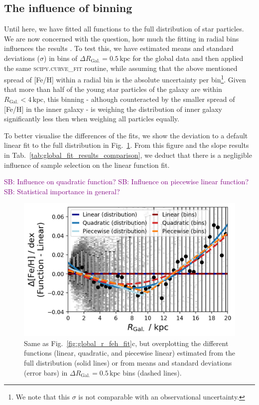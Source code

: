 \documentclass[fleqn,usenatbib]{mnras}
\newcommand{\SB}[1]{{\textcolor{purple}{SB: #1}}}
\begin{document}
\subsection{The influence of binning}

Until here, we have fitted all functions to the full distribution of star particles. We are now concerned with the question, how much the fitting in radial bins influences the results \citep[see also][who fitted functions to radially binned IllustrisTNG data]{Hemler2021}. To test this, we have estimated means and standard deviations ($\sigma$) in bins of $\Delta R_\mathrm{Gal.} = 0.5\,\mathrm{kpc}$ for the global data and then applied the same \textsc{scipy.curve\_fit} routine, while assuming that the above mentioned spread of [Fe/H] within a radial bin is the absolute uncertainty per bin\footnote{We note that this $\sigma$ is not comparable with an observational uncertainty.}. Given that more than half of the young star particles of the galaxy are within $R_\mathrm{Gal.} < 4\,\mathrm{kpc}$, this binning - although counteracted by the smaller spread of [Fe/H] in the inner galaxy - is weighing the distribution of inner galaxy significantly less then when weighing all particles equally.

To better visualise the differences of the fits, we show the deviation to a default linear fit to the full distribution in Fig.~\ref{fig:linear_quadratic_piecewise}. From this figure and the slope results in Tab.~\ref{tab:global_fit_results_comparison}, we deduct that there is a negligible influence of sample selection on the linear function fit. 

\SB{Influence on quadratic function?}
\SB{Influence on piecewise linear function?}
\SB{Statistical importance in general?}

\begin{figure}
    \centering
    \includegraphics[width=\columnwidth]{figures/linear_quadratic_piecewise.png}
    \caption{Same as Fig.~\ref{fig:global_r_feh_fit}c, but overplotting the different functions (linear, quadratic, and piecewise linear) estimated from the full distribution (solid lines) or from means and standard deviations (error bars) in $\Delta R_\mathrm{Gal.} = 0.5\,\mathrm{kpc}$ bins (dashed lines).}
    \label{fig:linear_quadratic_piecewise}
\end{figure}
\end{document}
